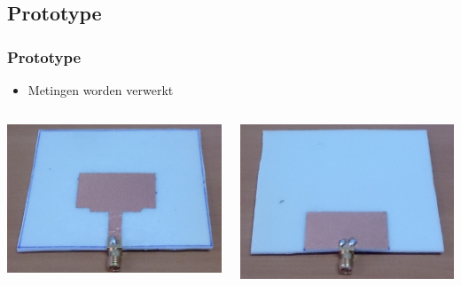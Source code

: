 \documentclass{beamer}
\begin{document}
\subsection{Prototype}
  \begin{frame}
  \frametitle{Prototype}
    \begin{itemize}
      \item Metingen worden verwerkt
    \end{itemize}
    \begin{columns}[c]
    \begin{column}{0.5\textwidth}
      \includegraphics[width=\textwidth, height=0.75\textwidth]{images/patch_proto_front.jpg}
    \end{column}%
    \begin{column}{0.5\textwidth}
      \includegraphics[width=\textwidth, height=0.75\textwidth]{images/patch_proto_back.jpg}
    \end{column}
    \end{columns}
  \end{frame}
\end{document}
